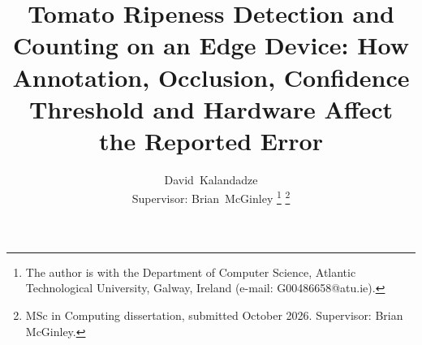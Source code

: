
\usepackage{booktabs}
\usepackage{graphicx}
\usepackage{url}
\usepackage{amssymb}           %

\graphicspath{{figures/}}

\newcommand{\pending}[1]{\textbf{[pending: #1]}}

\title{Tomato Ripeness Detection and Counting on an Edge Device: How Annotation, Occlusion, Confidence Threshold and Hardware Affect the Reported Error}

\author{%
  David~Kalandadze\\
  {\normalsize Supervisor: Brian~McGinley}%
  \thanks{The author is with the Department of Computer Science, Atlantic
  Technological University, Galway, Ireland (e-mail: G00486658@atu.ie).}%
  \thanks{MSc in Computing dissertation, submitted October 2026.
  Supervisor: Brian McGinley.}%
}

